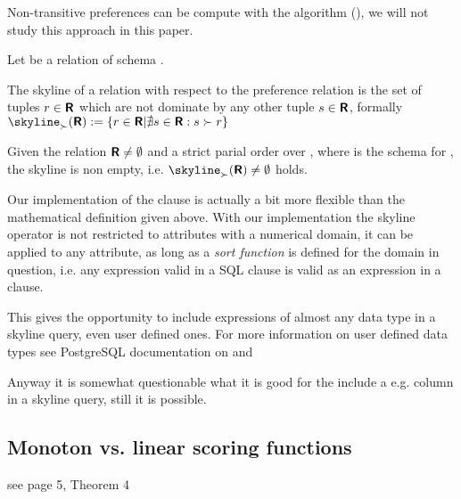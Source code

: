 Non-transitive preferences can be compute with the  algorithm (\citep{Torlone2002, Ciaccia2004}), we will not study this approach in this paper.

\begin{definition}
\todo{}{}Let  be a relation of schema .
\end{definition}

\begin{definition}[Skyline]
The skyline of a relation  with respect to the preference relation \dominates is the set of tuples $r \in \textnormal{\bf\textsf{R}}$ which are not dominate by any other tuple $s \in \textnormal{\bf\textsf{R}}$, formally $\skyline_\dominates(\relation{R}) := \{ r \in \relation{R} | \nexists s \in \relation{R} : s \dominates r \}$
\end{definition}

\begin{lemma}
Given the relation $\textnormal{\bf\textsf{R}} \not= \emptyset$ and \dominates a strict parial order over , where  is the schema for , the skyline is non empty, i.e. $\skyline_\dominates(\relation{R}) \not= \emptyset$ holds.
\end{lemma}

Our implementation of the  clause is actually a bit more flexible than the mathematical definition given above. With our implementation the skyline operator is not restricted to attributes with a numerical domain, it can be applied to any attribute, as long as a \emph{sort function} is defined for the domain in question, i.e.\/ any expression valid in a SQL  clause is valid as an expression in a  clause.

This gives the opportunity to include expressions of almost any data type in a skyline query, even user defined ones. For more information on user defined data types see PostgreSQL documentation on  and 

Anyway it is somewhat questionable what it is good for the include a e.g.  column in a skyline query, still it is possible.

\subsection{Monoton vs. linear scoring functions}
see \citep{Chomicki2002a} page 5, Theorem 4

